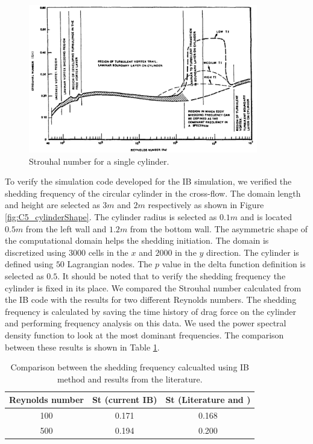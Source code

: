 %
\begin{figure}[H]
    \centering
    \includegraphics[width=10.00cm]{Chapter_5/figure/StrouhalVsReynodsl.png}
    \caption{Strouhal number for a single cylinder.}
    \label{fig:C5_strouhalVSreynoldsNumber}
\end{figure}
%
To verify the simulation code developed for the IB simulation, we verified the shedding frequency of the circular cylinder in the cross-flow. The domain length and height are selected as $3 m$ and $2 m$ respectively as shown in Figure \ref{fig:C5_cylinderShape}. The cylinder radius is selected as $0.1 m$ and is located $0.5 m$ from the left wall and $1.2 m$ from the bottom wall. The asymmetric shape of the computational domain helps the shedding initiation. The domain is discretized using $3000$ cells in the $x$ and $2000$ in the $y$ direction. The cylinder is defined using $50$ Lagrangian nodes. The $p$ value in the delta function definition is selected as $0.5$. It should be noted that to verify the shedding frequency the cylinder is fixed in its place. We compared the Strouhal number calculated from the IB code with the results \cite{mittal2001control} for two different Reynolds numbers. The shedding frequency is calculated by saving the time history of drag force on the cylinder and performing frequency analysis on this data. We used the power spectral density function to look at the most dominant frequencies. The comparison between these results is shown in Table \ref{table:C5_strouhalVerification}.
%
\begin{table}[H]
\centering
\begin{tabular}{c | c | c}
     Reynolds number & St (current IB) & St (Literature \cite{jendrzejczyk1985fluid} and \cite{mittal2001control}) \\ \hline \hline
     100 & 0.171 & 0.168 \\ \hline
     500 & 0.194 & 0.200 \\
\end{tabular}
\caption{Comparison between the shedding frequency calcualted using IB method and results from the literature.}
\label{table:C5_strouhalVerification}
\end{table}
